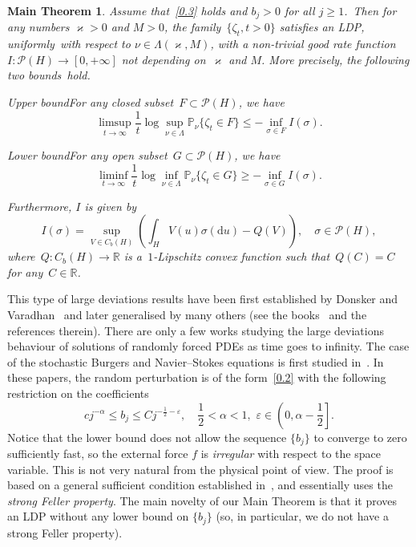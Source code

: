 \documentclass[AHL,Unicode,longabstracts]{cedram}
\newcommand{\e}{\varepsilon}
\newcommand{\R}{{\mathbb R}}
\newcommand{\pP}{{\mathbb P}}
\newcommand{\PP}{{\mathcal P}}
\newcommand{\vk}{{\varkappa}}
\newcommand{\ty}{\infty}
\newcommand{\dd}{\mathrm{d}}
\newtheorem*{mtheorem}{Main Theorem}
\begin{document}
\begin{mtheorem}
Assume that~\eqref{0.3} holds and $b_j>0$ for all $j\ge1$.~Then for any numbers $\vk>0$ and $M>0$, the family~$\{\zeta_t,t>0\}$ satisfies an LDP, uniformly~with respect to $\nu\in\Lambda(\varkappa,M)$, with a non-trivial good rate function $I: \PP(H)\to [0,+\ty]$ not depending on~$\vk$ and $M$. More precisely, the following two bounds~hold.

Upper bound\pointir For any closed subset~$F\subset\PP(H)$, we have
\[
\limsup_{t\to\infty} \frac1t\log \sup_{\nu\in\Lambda} \pP_\nu\{\zeta_t\in F\}\le -\inf_{\sigma\in F} I(\sigma).
\]

Lower bound\pointir For any open subset~$G\subset\PP(H)$, we have
\[
\liminf_{t\to\infty} \frac1t\log \inf_{\nu\in\Lambda}\pP_\nu\{\zeta_t\in G\}\ge -\inf_{\sigma\in G}I(\sigma).
\]

Furthermore, $I$ is given by
\begin{equation}\label{E:II}
I(\sigma)=\sup_{V\in C_b(H)} \left(\int_H V(u)\sigma(\dd u)-Q(V) \right),
\quad \sigma\in\PP(H),
\end{equation}
where~$Q:C_b(H)\to\R$ is a~$1$-Lipschitz convex function such that~$Q(C)=C$ for any~$C\in\R$.
\end{mtheorem}

This type of large deviations results have been first established by Donsker and Varadhan~\cite{DV-1975} and later generalised by many others (see the books~\cite{FW1984,DS1989,ADOZ00} and the references therein). There are only a few works studying the large deviations behaviour of solutions of randomly forced PDEs as time goes to infinity. The case of the stochastic Burgers and Navier--Stokes equations is first studied in~\cite{gourcy-2007b, gourcy-2007a}. In these papers, the random perturbation is of the form~\eqref{0.2} with the following restriction on the coefficients
\begin{equation}\label{Gougz}
cj^{-\alpha}\le b_j\le Cj^{-\frac12-\e}, \quad \frac12<\alpha<1,\,\, \e\in \left(0, \alpha-\frac12\right].
\end{equation}
Notice that the lower bound does not allow the sequence $\{b_j\}$ to converge to zero sufficiently fast, so the external force $f$ is \emph{irregular} with respect to the space variable. This is not very natural from the physical point of view. The proof is based on a general sufficient condition established in~\cite{wu-2001}, and essentially uses the \emph{strong Feller property}. The main novelty of our Main Theorem is that it proves an LDP without any lower bound on $\{b_j\}$ (so, in particular, we do not have a strong Feller property).
\end{document}
